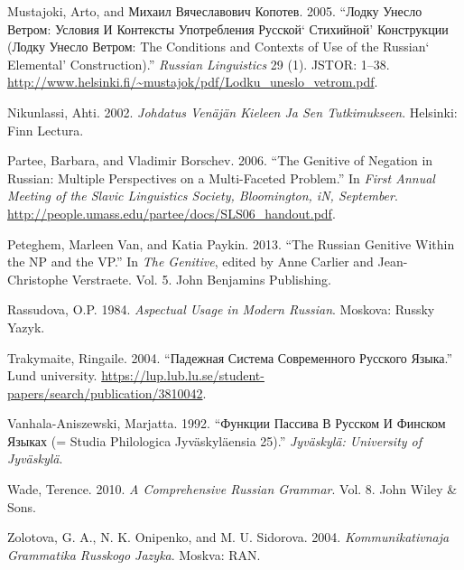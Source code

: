 \documentclass[]{scrreprt}
\begin{document}
Mustajoki, Arto, and Михаил Вячеславович Копотев. 2005. ``Лодку Унесло
Ветром: Условия И Контексты Употребления Русской` Стихийной' Конструкции
(Лодку Унесло Ветром: The Conditions and Contexts of Use of the Russian`
Elemental' Construction).'' \emph{Russian Linguistics} 29 (1). JSTOR:
1--38.
\url{http://www.helsinki.fi/~mustajok/pdf/Lodku_uneslo_vetrom.pdf}. \\

Nikunlassi, Ahti. 2002. \emph{Johdatus Venäjän Kieleen Ja Sen
Tutkimukseen}. Helsinki: Finn Lectura. \\

Partee, Barbara, and Vladimir Borschev. 2006. ``The Genitive of Negation
in Russian: Multiple Perspectives on a Multi-Faceted Problem.'' In
\emph{First Annual Meeting of the Slavic Linguistics Society,
Bloomington, iN, September}.
\url{http://people.umass.edu/partee/docs/SLS06_handout.pdf}. \\

Peteghem, Marleen Van, and Katia Paykin. 2013. ``The Russian Genitive
Within the NP and the VP.'' In \emph{The Genitive}, edited by Anne
Carlier and Jean-Christophe Verstraete. Vol. 5. John Benjamins
Publishing. \\

Rassudova, O.P. 1984. \emph{Aspectual Usage in Modern Russian}. Moskova:
Russky Yazyk. \\

Trakymaite, Ringaile. 2004. ``Падежная Система Современного Русского
Языка.'' Lund university.
\url{https://lup.lub.lu.se/student-papers/search/publication/3810042}. \\

Vanhala-Aniszewski, Marjatta. 1992. ``Функции Пассива В Русском И
Финском Языках (= Studia Philologica Jyväskyläensia 25).''
\emph{Jyväskylä: University of Jyväskylä}. \\

Wade, Terence. 2010. \emph{A Comprehensive Russian Grammar}. Vol. 8.
John Wiley \& Sons. \\

Zolotova, G. A., N. K. Onipenko, and M. U. Sidorova. 2004.
\emph{Kommunikativnaja Grammatika Russkogo Jazyka}. Moskva: RAN. \\
\end{document}
